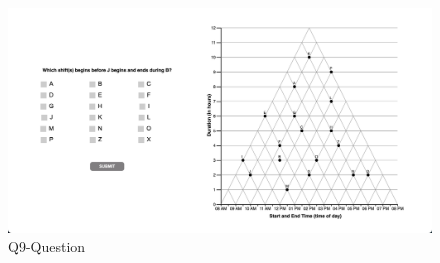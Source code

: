 \documentclass[
  letterpaper,
  DIV=11,
  numbers=noendperiod]{scrreprt}
\begin{document}
\begin{figure}

{\centering \includegraphics{analysis/SGC3A/static/questions/Q9.png}

}

\caption{\label{fig-Q9}Q9-Question}

\end{figure}
\end{document}
